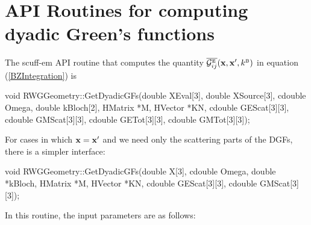 \documentclass[letterpaper]{article}
\begin{document}
\newpage
\section{API Routines for computing dyadic Green's functions}

The {\sc scuff-em} API routine that computes the quantity
$\overline{\mathcal{G}^{\hbox{\tiny{E}}}_{ij}}(\mathbf{x}, \mathbf{x}^\prime, k^{\hbox{\tiny{B}}})$
in equation (\ref{BZIntegration}) is 

\smallskip 
\begin{center}
\begin{verbcode}
void RWGGeometry::GetDyadicGFs(double XEval[3], double XSource[3],
                               cdouble Omega, double kBloch[2],
                               HMatrix *M, HVector *KN,
                               cdouble GEScat[3][3],
                               cdouble GMScat[3][3],
                               cdouble GETot[3][3],
                               cdouble GMTot[3][3]);
\end{verbcode}
\end{center}
\smallskip

For cases in which $\mathbf{x}=\mathbf{x}^\prime$ and we need only the 
scattering parts of the DGFs, there is a simpler interface:

\smallskip 
\begin{center}
\begin{verbcode}
void RWGGeometry::GetDyadicGFs(double X[3], cdouble Omega, 
                               double *kBloch,
                               HMatrix *M, HVector *KN,
                               cdouble GEScat[3][3], 
                               cdouble GMScat[3][3]);
\end{verbcode}
\end{center}
\smallskip 

In this routine, the input parameters are as follows:
\end{document}
